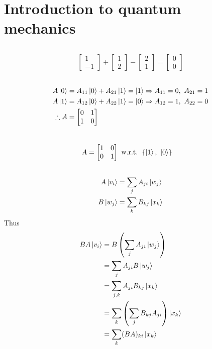\setcounter{section}{1}
\section{Introduction to quantum mechanics}
\subsection{}
\begin{align}
	\begin{bmatrix}
		1 \\ 
		-1
	\end{bmatrix} 
	+
	\begin{bmatrix}
		1 \\ 
		2
	\end{bmatrix}
	-
	\begin{bmatrix}
		2 \\ 
		1
	\end{bmatrix}
	=
	\begin{bmatrix}
		0 \\ 
		0
	\end{bmatrix}	
\end{align}

\subsection{}
\begin{align}
	A\ket{0} &= A_{11}\ket{0} + A_{21}\ket{1} = \ket{1} \Rightarrow A_{11} = 0,\ A_{21} = 1\\
	A\ket{1} &= A_{12}\ket{0} + A_{22}\ket{1} = \ket{0} \Rightarrow A_{12} = 1,\ A_{22} = 0\\
%
	\therefore A &= 	
	\begin{bmatrix}
		0 & 1 \\ 
		1 & 0
	\end{bmatrix} 
\end{align}\\

\begin{align}
	A &= 	
	\begin{bmatrix}
	1 & 0 \\ 
	0 & 1
	\end{bmatrix} \text{ w.r.t. } \left\{\ket{1},\ \ket{0} \right\}
\end{align}


\subsection{}
\begin{align}
	A \ket{v_i} &= \sum_{j} A_{ji}\ket{w_j}\\
	B \ket{w_j} &= \sum_{k} B_{kj}\ket{x_k}
\end{align}
%
Thus
\begin{align}
	BA \ket{v_i} &= B \left( \sum_{j} A_{ji}\ket{w_j} \right)\\
	&= \sum_{j} A_{ji} B\ket{w_j}\\
	&= \sum_{j,k} A_{ji} B_{kj}\ket{x_k}\\
	&= \sum_k \left( \sum_j B_{kj} A_{ji}  \right) \ket{x_k}\\
	&= \sum_k (BA)_{ki} \ket{x_k}
\end{align}



